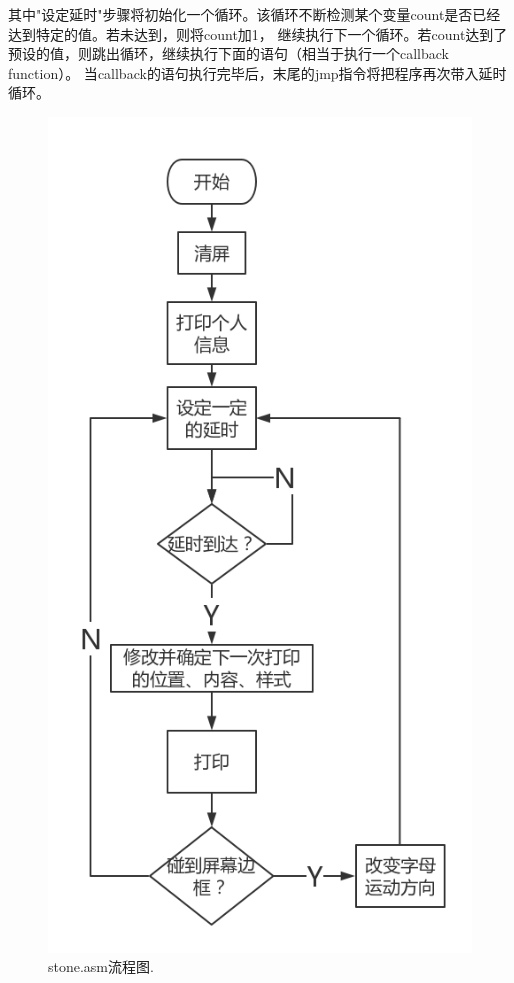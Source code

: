 \documentclass[a4paper]{article}
\newcommand{\codev}[1]{\textsf{#1}}
\begin{document}
其中"设定延时"步骤将初始化一个循环。该循环不断检测某个变量\codev{count}是否已经达到特定的值。若未达到，则将\codev{count}加1，
继续执行下一个循环。若\codev{count}达到了预设的值，则跳出循环，继续执行下面的语句（相当于执行一个\codev{callback function}）。
当\codev{callback}的语句执行完毕后，末尾的\codev{jmp}指令将把程序再次带入延时循环。
\begin{figure}  
    \begin{center}  
    \includegraphics[scale=0.5]{asset/procedure.png}  
    \caption{stone.asm流程图.\label{fig:procedure}}  
    \end{center}  
\end{figure}  
\end{document}
